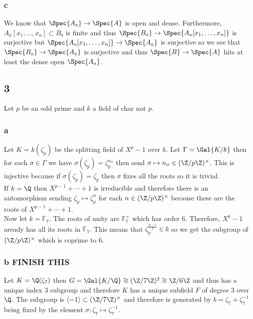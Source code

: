 \documentclass[12pt]{article}
\renewcommand{\F}{\mathbb{F}}
\begin{document}
\subsubsection{c}

We know that $\Spec{A_a} \to \Spec{A}$ is open and dense. Furthermore, $A_a[x_1, \dots, x_n] \subset B_b$ is finite and thus $\Spec{B_a} \to \Spec{A_a[x_1, \dots, x_n]}$ is surjective but $\Spec{A_a[x_1, \dots, x_n]} \to \Spec{A_a}$ is surjective so we see that $\Spec{B_a} \to \Spec{A_a}$ is surjective and thus $\Spec{B} \to \Spec{A}$ hits at least the dense open $\Spec{A_a}$.

\subsection{3} 

Let $p$ be an odd prime and $k$ a field of char not $p$. 

\subsubsection{a}

Let $K = k(\zeta_p)$  be the splitting field of $X^p - 1$ over $k$. Let $\Gamma = \Gal{K/k}$ then for each $\sigma \in \Gamma$ we have $\sigma(\zeta_p) = \zeta_p^{n_\sigma}$ then send $\sigma \mapsto n_\sigma \in (\Z / p \Z)^\times$. This is injective because if $\sigma(\zeta_p) = \zeta_p$ then $\sigma$ fixes all the roots so it is trivial. 
\bigskip\\
If $k = \Q$ then $X^{p-1} + \cdots + 1$ is irreducible and therefore there is an automorphism sending $\zeta_p \mapsto \zeta_p^n$ for each $n \in (\Z / p \Z)^\times$ because these are the roots of $X^{p-1} + \cdots + 1$. 
\bigskip\\
Now let $k = \F_7$. The roots of unity are $\F_7^\times$ which has order $6$. Therefore, $X^6 - 1$ aready has all its roots in $\F_7$. This means that $\zeta_p^{\frac{p-1}{2}} \in k$ so we get the subgroup of $(\Z / p \Z)^\times$ which is coprime to $6$. 

\subsubsection{b FINISH THIS}

Let $K = \Q(\zeta_7)$ then $G = \Gal{K/\Q} \cong (\Z / 7 \Z)^2 \cong \Z / 6 \Z$ and thus has a unique index $3$ subgroup and therefore $K$ has a unique subfield $F$ of degree $3$ over $\Q$. The subgroup is $\left< - 1 \right> \subset (\Z / 7 \Z)^\times$ and therefore is generated by $b = \zeta_7 + \zeta_7^{-1}$ being fixed by the element $\sigma : \zeta_7 \mapsto \zeta_7^{-1}$. 
\end{document}
